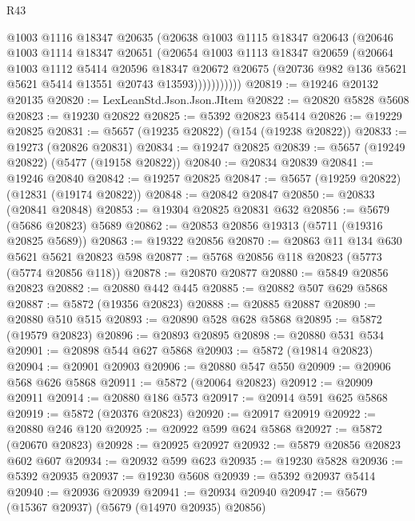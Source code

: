 \begin{lexlean}{R43}
\begin{coremodule}
                @1003
                @1116
                @18347
                @20635
                (@20638
                  @1003
                  @1115
                  @18347
                  @20643
                  (@20646
                    @1003
                    @1114
                    @18347
                    @20651
                    (@20654
                      @1003
                      @1113
                      @18347
                      @20659
                      (@20664
                        @1003
                        @1112
                        @5414
                        @20596
                        @18347
                        @20672
                        @20675
                        (@20736 @982 @136 @5621 @5621 @5414 @13551 @20743 @13593)))))))))))
@20819 := @19246 @20132 @20135
@20820 := LexLeanStd.Json.Json.JItem
@20822 := @20820 @5828 @5608
@20823 := @19230 @20822
@20825 := @5392 @20823 @5414
@20826 := @19229 @20825
@20831 := @5657 (@19235 @20822) (@154 (@19238 @20822))
@20833 := @19273 (@20826 @20831)
@20834 := @19247 @20825
@20839 := @5657 (@19249 @20822) (@5477 (@19158 @20822))
@20840 := @20834 @20839
@20841 := @19246 @20840
@20842 := @19257 @20825
@20847 := @5657 (@19259 @20822) (@12831 (@19174 @20822))
@20848 := @20842 @20847
@20850 := @20833 (@20841 @20848)
@20853 := @19304 @20825 @20831 @632
@20856 := @5679 (@5686 @20823) @5689
@20862 := @20853 @20856 @19313 (@5711 (@19316 @20825 @5689))
@20863 := @19322 @20856
@20870 := @20863 @11 @134 @630 @5621 @5621 @20823 @598
@20877 := @5768 @20856 @118 @20823 (@5773 (@5774 @20856 @118))
@20878 := @20870 @20877
@20880 := @5849 @20856 @20823
@20882 := @20880 @442 @445
@20885 := @20882 @507 @629 @5868
@20887 := @5872 (@19356 @20823)
@20888 := @20885 @20887
@20890 := @20880 @510 @515
@20893 := @20890 @528 @628 @5868
@20895 := @5872 (@19579 @20823)
@20896 := @20893 @20895
@20898 := @20880 @531 @534
@20901 := @20898 @544 @627 @5868
@20903 := @5872 (@19814 @20823)
@20904 := @20901 @20903
@20906 := @20880 @547 @550
@20909 := @20906 @568 @626 @5868
@20911 := @5872 (@20064 @20823)
@20912 := @20909 @20911
@20914 := @20880 @186 @573
@20917 := @20914 @591 @625 @5868
@20919 := @5872 (@20376 @20823)
@20920 := @20917 @20919
@20922 := @20880 @246 @120
@20925 := @20922 @599 @624 @5868
@20927 := @5872 (@20670 @20823)
@20928 := @20925 @20927
@20932 := @5879 @20856 @20823 @602 @607
@20934 := @20932 @599 @623
@20935 := @19230 @5828
@20936 := @5392 @20935
@20937 := @19230 @5608
@20939 := @5392 @20937 @5414
@20940 := @20936 @20939
@20941 := @20934 @20940
@20947 := @5679 (@15367 @20937) (@5679 (@14970 @20935) @20856)

\end{coremodule}
\end{lexlean}
